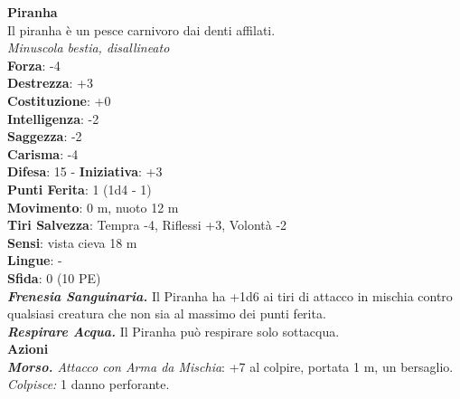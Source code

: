 \begin{multicols}{2}
\medskip\textbf{Piranha}\\
Il piranha è un pesce carnivoro dai denti affilati.\\
\emph{Minuscola bestia, disallineato}\\
\textbf{Forza}: -4\\
\textbf{Destrezza}: +3\\
\textbf{Costituzione}: +0\\
\textbf{Intelligenza}: -2\\
\textbf{Saggezza}: -2\\
\textbf{Carisma}: -4\\
\textbf{Difesa}: 15 - \textbf{Iniziativa}: +3\\
\textbf{Punti Ferita}: 1 (1d4 - 1)\\
\textbf{Movimento}: 0 m, nuoto 12 m\\
\textbf{Tiri Salvezza}: Tempra -4, Riflessi +3, Volontà -2 \\
\textbf{Sensi}: vista cieva 18 m\\
\textbf{Lingue}: -\\
\textbf{Sfida}: 0 (10 PE)\smallskip\\
\emph{\textbf{Frenesia Sanguinaria.}} Il Piranha ha +1d6 ai tiri di attacco in mischia contro qualsiasi creatura che non sia al massimo dei punti ferita.\\
\emph{\textbf{Respirare Acqua.}} Il Piranha può respirare solo sottacqua.\\ \smallskip\textbf{Azioni}\\
\emph{\textbf{Morso.} Attacco con Arma da Mischia}: +7 al colpire, portata 1 m, un bersaglio.
\emph{Colpisce:} 1 danno perforante.\\


\end{multicols}
